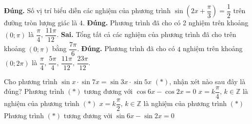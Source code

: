 \begin{ex}
{\begin{center}
 \end{center}
 \begin{itemchoice}
  \itemch \textbf{Đúng.} Số vị trí biểu diễn các nghiệm của phương trình $\sin \left(2 x+\dfrac{\pi}{3}\right)=\dfrac{1}{2}$  trên đường tròn lượng giác là $4$.
   \itemch \textbf{Đúng.} Phương trình đã cho có 2 nghiệm trên khoảng $(0; \pi)$ là $\dfrac{\pi}{4}$, $\dfrac{11 \pi}{12}$.
  \itemch \textbf{Sai.} Tổng tất cả các nghiệm  của phương trình đã cho trên khoảng $(0; \pi)$ bằng $\dfrac{7 \pi}{6}$.
  \itemch \textbf{Đúng.} Phương trình đã  cho có $4$ nghiệm trên khoảng $(0; 2 \pi)$ là $\dfrac{\pi}{4}$, $\dfrac{5 \pi}{4}$, $\dfrac{11 \pi}{12}$, $\dfrac{23 \pi}{12}$.
 \end{itemchoice}
 }
\end{ex}

\begin{ex}%
 Cho phương  trình $\sin x\cdot\sin 7x=\sin 3x\cdot\sin 5x$ $(*)$, nhận xét nào sau đây là đúng?
 \choiceTF 
  {\True Phương trình $(*)$  tương đương với $\cos6x-\cos2x=0$}
  {\True $x=k\dfrac{\pi}{4}$, $k\in\mathbb{Z}$ là nghiệm của  phương trình $(*)$}
  {\True $x=k\dfrac{\pi}{2}$, $k\in\mathbb{Z}$ là nghiệm của phương trình $(*)$} 
  {Phương trình  $(*)$ tương đương với $\sin6x-\sin2x=0$}
\end{ex}

